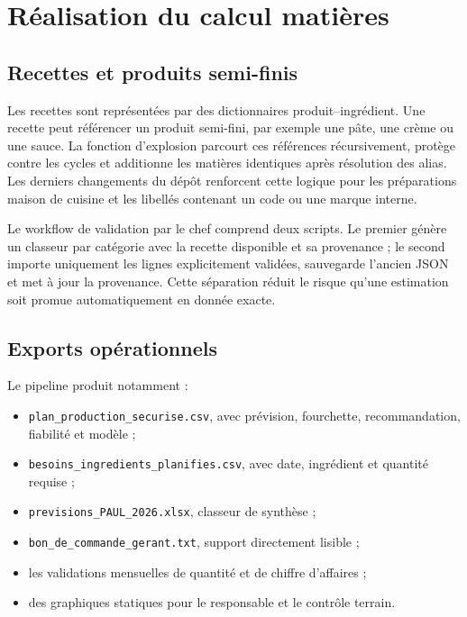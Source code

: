 \section{Réalisation du calcul matières}

\subsection{Recettes et produits semi-finis}

Les recettes sont représentées par des dictionnaires produit--ingrédient. Une
recette peut référencer un produit semi-fini, par exemple une pâte, une crème ou
une sauce. La fonction d'explosion parcourt ces références récursivement, protège
contre les cycles et additionne les matières identiques après résolution des
alias. Les derniers changements du dépôt renforcent cette logique pour les
préparations maison de cuisine et les libellés contenant un code ou une marque
interne.

Le workflow de validation par le chef comprend deux scripts. Le premier génère un
classeur par catégorie avec la recette disponible et sa provenance ; le second
importe uniquement les lignes explicitement validées, sauvegarde l'ancien JSON et
met à jour la provenance. Cette séparation réduit le risque qu'une estimation soit
promue automatiquement en donnée exacte.

\subsection{Exports opérationnels}

Le pipeline produit notamment :

\begin{itemize}
  \item \texttt{plan\_production\_securise.csv}, avec prévision, fourchette,
  recommandation, fiabilité et modèle ;
  \item \texttt{besoins\_ingredients\_planifies.csv}, avec date, ingrédient et
  quantité requise ;
  \item \texttt{previsions\_PAUL\_2026.xlsx}, classeur de synthèse ;
  \item \texttt{bon\_de\_commande\_gerant.txt}, support directement lisible ;
  \item les validations mensuelles de quantité et de chiffre d'affaires ;
  \item des graphiques statiques pour le responsable et le contrôle terrain.
\end{itemize}

